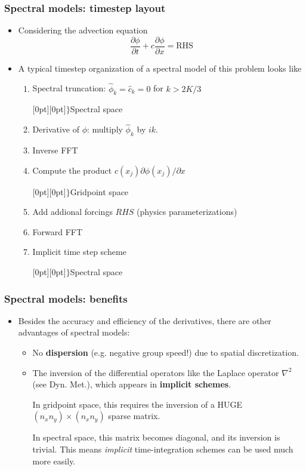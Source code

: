 \documentclass[aspectratio=149,9pt]{beamer}
\begin{document}
%
%
\begin{frame}
	\frametitle{Spectral models: timestep layout}
	\vfill\begin{itemize}
		\item Considering the advection equation
			\begin{equation*}
				\frac{\partial \phi}{\partial t}+c\frac{\partial \phi}{\partial x}=\text{RHS}
			\end{equation*}\vfill
		\item A typical timestep organization of a spectral model of this problem looks like\vfill
			\begin{enumerate}
				\item \parbox{.65\textwidth}{Spectral truncation: $\hat \phi_k = \hat c_k = 0$ for $k>2K/3$}\raisebox{-1.9ex}[0pt][0pt]{$\Bigg\}$\quad Spectral space}
				\item Derivative of $\phi$: multiply $\hat\phi_k$ by $ik$.
				\item Inverse FFT
				\item \parbox{.65\textwidth}{Compute the product $c(x_j) \partial \phi (x_j) / \partial x$}\raisebox{-1.9ex}[0pt][0pt]{$\Bigg\}$\quad Gridpoint space}
				\item Add addional forcings $RHS$ (physics parameterizations)
				\item Forward FFT
				\item \parbox{.65\textwidth}{Implicit time step scheme}\raisebox{0ex}[0pt][0pt]{$\big\}$\quad Spectral space}
			\end{enumerate}
	\end{itemize}\vfill
\end{frame}
%
%
\begin{frame}
	\frametitle{Spectral models: benefits}
	\vfill\begin{itemize}
		\item Besides the accuracy and efficiency of the derivatives, there are other advantages of spectral models:\vfill
		\begin{itemize}
			\item No \textbf{dispersion} (e.g. negative group speed!) due to spatial discretization.\vfill
			\item The inversion of the differential operators like the Laplace operator $\nabla^2$ (see Dyn. Met.), which appears in \textbf{implicit schemes}.\vspace*{2ex}
				\par
				In gridpoint space, this requires the inversion of a HUGE $(n_xn_y)\times(n_xn_y)$ sparse matrix.
				\vspace*{2ex}\par
				In spectral space, this matrix becomes diagonal, and its inversion is trivial. This means \emph{implicit} time-integration schemes can be used much more easily.
		\end{itemize}
	\end{itemize}\vfill
\end{frame}
\end{document}

